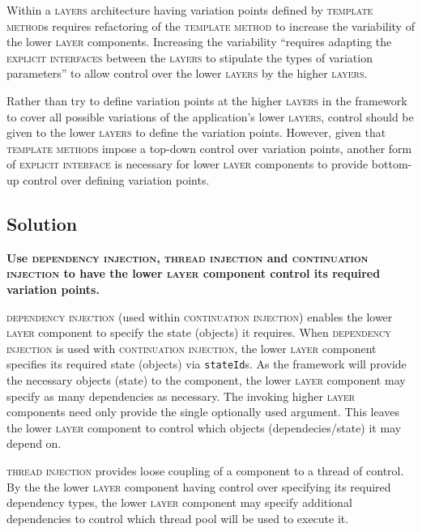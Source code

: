\documentclass[prodmode]{style/acmlarge}
\begin{document}
Within a \textsc{layers} architecture having variation points defined by
\textsc{template method}s requires refactoring of the \textsc{template method}
to increase the variability of the lower \textsc{layer} components.  Increasing the
variability ``requires adapting the \textsc{explicit interfaces} between the
\textsc{layers} to stipulate the types of variation parameters'' \cite[p.
5]{ioc} to allow control over the lower \textsc{layers} by the higher
\textsc{layers}.

Rather than try to define variation points at the higher \textsc{layers} in the
framework to cover all possible variations of the application's lower
\textsc{layers}, control should be given to the lower \textsc{layers} to define
the variation points.  However, given that \textsc{template methods} impose a
top-down control over variation points, another form of \textsc{explicit
interface} is necessary for lower \textsc{layer} components to provide bottom-up
control over defining variation points.


\subsection{Solution}

\textbf{Use \textsc{dependency injection}, \textsc{thread injection} and \textsc{continuation injection} to have the lower \textsc{layer} component control its required variation points.}

\textsc{dependency injection} (used within \textsc{continuation injection})
enables the lower \textsc{layer} component to specify the state (objects) it
requires.  When \textsc{dependency injection} is used with \textsc{continuation
injection}, the lower \textsc{layer} component specifies its required state
(objects) via \texttt{stateId}s.  As the framework will provide the necessary
objects (state) to the component, the lower \textsc{layer} component may specify
as many dependencies as necessary.  The invoking higher \textsc{layer}
components need only provide the single optionally used argument.  This leaves
the lower \textsc{layer} component to control which objects (dependecies/state)
it may depend on.

\textsc{thread injection} provides loose coupling of a component to a thread of
control.  By the the lower \textsc{layer} component having control over
specifying its required dependency types, the lower \textsc{layer} component may
specify additional dependencies to control which thread pool will be used to
execute it.
\end{document}
